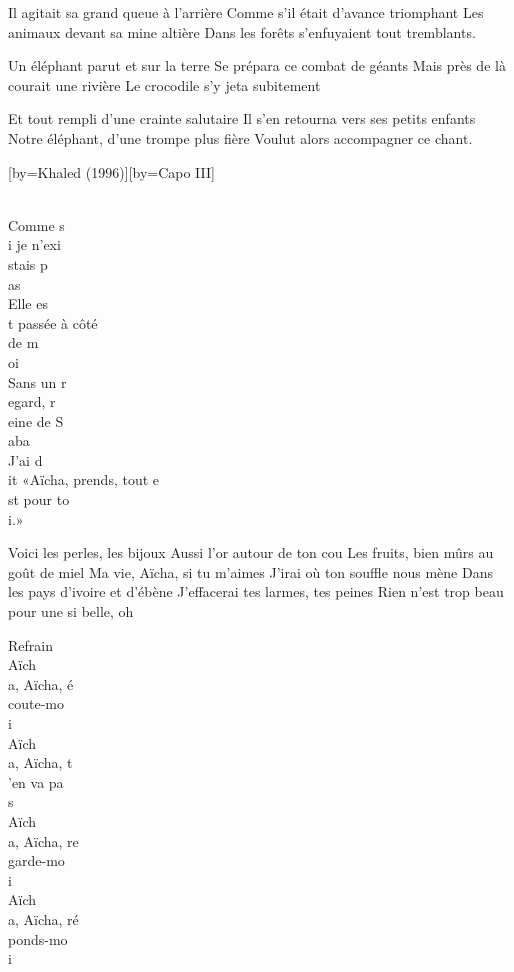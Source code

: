 \beginverse
Il agitait sa grand queue à l'arrière
Comme s'il était d'avance triomphant
Les animaux devant sa mine altière
Dans les forêts s'enfuyaient tout tremblants.
\endverse

\beginverse
Un éléphant parut et sur la terre
Se prépara ce combat de géants
Mais près de là courait une rivière
Le crocodile s'y jeta subitement
\endverse

\beginverse
Et tout rempli d'une crainte salutaire
Il s'en retourna vers ses petits enfants
Notre éléphant, d'une trompe plus fière
Voulut alors accompagner ce chant.
\endverse

[by={Khaled (1996)}][by={Capo III}]

\\[Mim]Comme s\\[Do]i je n'exi\\[Sol]stais p\\[Ré]as
\\[Mim]Elle es\\[Do]t passée à côté\\[Sol] de m\\[Ré]oi
\\[Mim]Sans un r\\[Do]egard, r\\[Sol]eine de S\\[Ré]aba
\\[Mim]J'ai d\\[Do]it «Aïcha, prends, tout e\\[Sol]st pour to\\[Ré]i.»

\beginverse
Voici les perles, les bijoux 
Aussi l'or autour de ton cou
Les fruits, bien mûrs au goût de miel
Ma vie, Aïcha, si tu m'aimes
J'irai où ton souffle nous mène 
Dans les pays d'ivoire et d'ébène 
J'effacerai tes larmes, tes peines
Rien n'est trop beau pour une si belle, oh\!
\endverse

\beginverse
Refrain
\\[Mim]Aïch\\[Do]a, Aïcha, é\\[Sol]coute-mo\\[Ré]i
\\[Mim]Aïch\\[Do]a, Aïcha, t\\[Sol]’en va pa\\[Ré]s
\\[Mim]Aïch\\[Do]a, Aïcha, re\\[Sol]garde-mo\\[Ré]i
\\[Mim]Aïch\\[Do]a, Aïcha, ré\\[Sol]ponds-mo\\[Ré]i\!
\endverse

